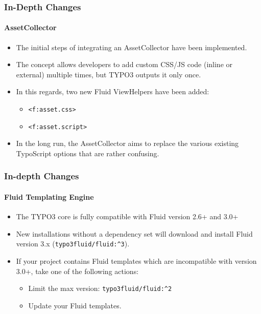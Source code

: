 
\begin{frame}[fragile]
	\frametitle{In-Depth Changes}
	\framesubtitle{AssetCollector}

	\begin{itemize}
		\item The initial steps of integrating an AssetCollector have been implemented.
		\item The concept allows developers to add custom CSS/JS code (inline or external)
			multiple times, but TYPO3 outputs it only once.
		\item In this regards, two new Fluid ViewHelpers have been added:
			\begin{itemize}
				\item \texttt{<f:asset.css>}
				\item \texttt{<f:asset.script>}
			\end{itemize}
		\item In the long run, the AssetCollector aims to replace the various existing
			TypoScript options that are rather confusing.
	\end{itemize}

\end{frame}


\begin{frame}[fragile]
	\frametitle{In-depth Changes}
	\framesubtitle{Fluid Templating Engine}

	\begin{itemize}
		\item The TYPO3 core is fully compatible with Fluid version 2.6+ and 3.0+
		\item New installations without a dependency set will download and install Fluid version 3.x
			(\texttt{typo3fluid/fluid:\^{}3}).
		\item If your project contains Fluid templates which are incompatible with version 3.0+,
			take one of the following actions:

			\begin{itemize}
				\item Limit the max version: \texttt{typo3fluid/fluid:\^{}2}
				\item Update your Fluid templates.
			\end{itemize}

	\end{itemize}

\end{frame}

